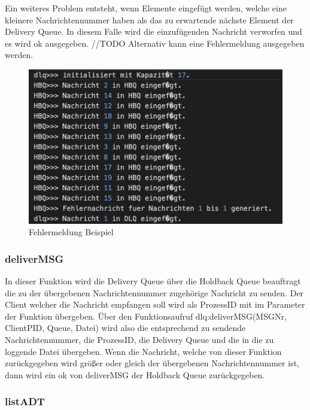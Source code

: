 Ein weiteres Problem entsteht, wenn Elemente eingefügt werden, welche eine kleinere Nachrichtennummer haben als das zu erwartende nächste Element der Delivery Queue. In diesem Falle wird die einzufügenden Nachricht verworfen und es wird ok ausgegeben.
//TODO Alternativ kann eine Fehlermeldung ausgegeben werden. 



\begin{figure}[htbp]
\begin{center}
\includegraphics[scale=0.6]{Bilder/BeispielHBQFehler}
\caption{\label{fig:BeispielHBQFehler} Fehlermeldung Beispiel \cite{HBQfehler}} 
\end{center}
\end{figure}

\subsubsection{deliverMSG}

In dieser Funktion wird die Delivery Queue über die Holdback Queue beauftragt die zu der übergebenen Nachrichtennummer zugehörige Nachricht zu senden. Der Client welcher die Nachricht empfangen soll wird als ProzessID mit im Parameter der Funktion übergeben. 
Über den Funktionsaufruf dlq:deliverMSG(MSGNr, ClientPID, Queue, Datei) wird also die entsprechend zu sendende Nachrichtennummer, die ProzessID, die Delivery Queue und die in die zu loggende Datei übergeben. 
Wenn die Nachricht, welche von dieser Funktion zurückgegeben wird größer oder gleich der übergebenen Nachrichtennummer ist, dann wird ein ok von deliverMSG der Holdback Queue zurückgegeben. 

\subsubsection{listADT}

